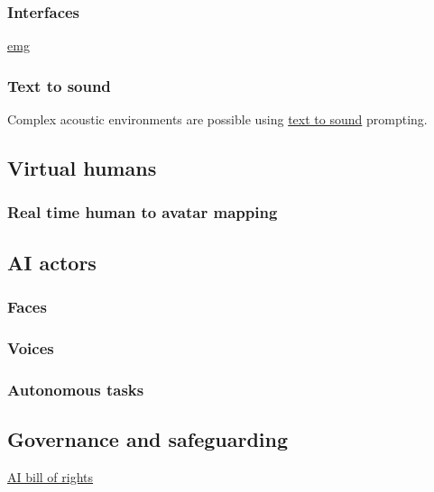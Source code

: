\subsubsection{Interfaces}
\href{https://tech.fb.com/ar-vr/2021/03/inside-facebook-reality-labs-wrist-based-interaction-for-the-next-computing-platform/}{emg}
\subsubsection{Text to sound}
Complex acoustic environments are possible using \href{https://anonymous.4open.science/w/iclr2023_samples-CB68/report.html}{text to sound} prompting. 
\subsection{Virtual humans}
\subsubsection{Real time human to avatar mapping}
\subsection{AI actors}
\subsubsection{Faces}
\subsubsection{Voices}
\subsubsection{Autonomous tasks}
\subsection{Governance and safeguarding}


\href{https://www.whitehouse.gov/ostp/ai-bill-of-rights/}{AI bill of rights}

